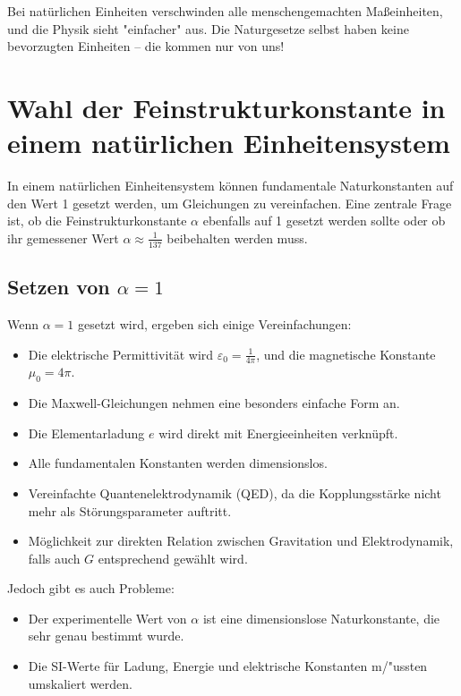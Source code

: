 \documentclass{article}
\begin{document}
	Bei natürlichen Einheiten verschwinden alle menschengemachten Maßeinheiten, und die Physik sieht "einfacher" aus. Die Naturgesetze selbst haben keine bevorzugten Einheiten – die kommen nur von uns!
	\section*{Wahl der Feinstrukturkonstante in einem natürlichen Einheitensystem}
	
	In einem natürlichen Einheitensystem können fundamentale Naturkonstanten auf den Wert 1 gesetzt werden, um Gleichungen zu vereinfachen. Eine zentrale Frage ist, ob die Feinstrukturkonstante \( \alpha \) ebenfalls auf 1 gesetzt werden sollte oder ob ihr gemessener Wert \( \alpha \approx \frac{1}{137} \) beibehalten werden muss.
	
	\subsection*{Setzen von \( \alpha = 1 \)}
	
	Wenn \( \alpha = 1 \) gesetzt wird, ergeben sich einige Vereinfachungen:
	
	\begin{itemize}
		\item Die elektrische Permittivität wird \( \varepsilon_0 = \frac{1}{4\pi} \), und die magnetische Konstante \( \mu_0 = 4\pi \).
		\item Die Maxwell-Gleichungen nehmen eine besonders einfache Form an.
		\item Die Elementarladung \( e \) wird direkt mit Energieeinheiten verknüpft.
		\item Alle fundamentalen Konstanten werden dimensionslos.
		\item Vereinfachte Quantenelektrodynamik (QED), da die Kopplungsstärke nicht mehr als Störungsparameter auftritt.
		\item Möglichkeit zur direkten Relation zwischen Gravitation und Elektrodynamik, falls auch \( G \) entsprechend gewählt wird.
	\end{itemize}
	
	Jedoch gibt es auch Probleme:
	
	\begin{itemize}
		\item Der experimentelle Wert von \( \alpha \) ist eine dimensionslose Naturkonstante, die sehr genau bestimmt wurde.
		\item Die SI-Werte für Ladung, Energie und elektrische Konstanten m/"ussten umskaliert werden.
	\end{itemize}
	
\end{document}
